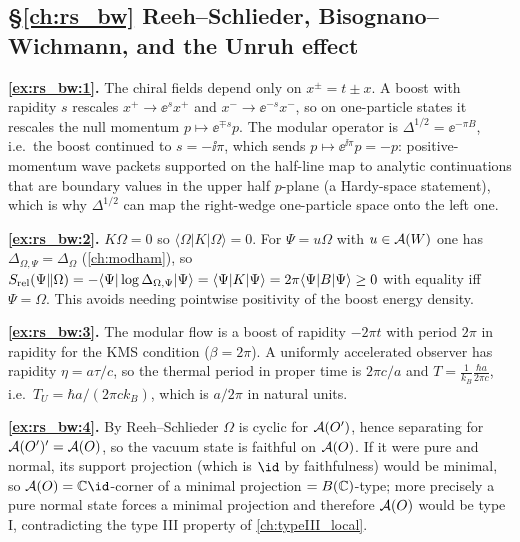 {\subsection*{\S\ref{ch:rs_bw} Reeh--Schlieder, Bisognano--Wichmann, and the Unruh effect}
\textbf{\ref{ex:rs_bw:1}.} The chiral fields depend only on $x^\pm=t\pm x$. A boost with rapidity $s$ rescales $x^+\to\ee^{s}x^+$ and $x^-\to\ee^{-s}x^-$, so on one-particle states it rescales the null momentum $p\mapsto\ee^{\mp s}p$. The modular operator is $\Delta^{1/2}=\ee^{-\pi B}$, i.e.\ the boost continued to $s=-\ii\pi$, which sends $p\mapsto\ee^{\ii\pi}p=-p$: positive-momentum wave packets supported on the half-line map to analytic continuations that are boundary values in the upper half $p$-plane (a Hardy-space statement), which is why $\Delta^{1/2}$ can map the right-wedge one-particle space onto the left one.\par
\textbf{\ref{ex:rs_bw:2}.} $K\Omega=0$ so $\langle\Omega|K|\Omega\rangle=0$. For $\Psi=u\Omega$ with $u\in\mathcal{A}(W)$ one has $\Delta_{\Omega,\Psi}=\Delta_\Omega$ (\cref{ch:modham}), so $S_{\rm rel}(\Psi\|\Omega)=-\langle\Psi|\log\Delta_{\Omega,\Psi}|\Psi\rangle=\langle\Psi|K|\Psi\rangle=2\pi\langle\Psi|B|\Psi\rangle\ge0$ with equality iff $\Psi=\Omega$. This avoids needing pointwise positivity of the boost energy density.\par
\textbf{\ref{ex:rs_bw:3}.} The modular flow is a boost of rapidity $-2\pi t$ with period $2\pi$ in rapidity for the KMS condition ($\beta=2\pi$). A uniformly accelerated observer has rapidity $\eta=a\tau/c$, so the thermal period in proper time is $2\pi c/a$ and $T=\frac{1}{k_B}\frac{\hbar a}{2\pi c}$, i.e.\ $T_U=\hbar a/(2\pi ck_B)$, which is $a/2\pi$ in natural units.\par
\textbf{\ref{ex:rs_bw:4}.} By Reeh--Schlieder $\Omega$ is cyclic for $\mathcal{A}(O')$, hence separating for $\mathcal{A}(O')'=\mathcal{A}(O)$, so the vacuum state is faithful on $\mathcal{A}(O)$. If it were pure and normal, its support projection (which is $\id$ by faithfulness) would be minimal, so $\A(O)=\C\id$-corner of a minimal projection $=B(\mathbb{C})$-type; more precisely a pure normal state forces a minimal projection and therefore $\mathcal{A}(O)$ would be type I, contradicting the type III property of \cref{ch:typeIII_local}.\par

}
